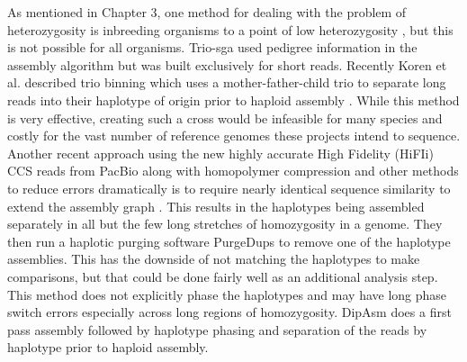 \par{
As mentioned in Chapter 3, one method for dealing with the problem of heterozygosity is inbreeding organisms to a point of low heterozygosity \cite{drosophila}, 
but this is not possible for all organisms. Trio-sga used pedigree information in the assembly algorithm \cite{trio-sga} 
but was built exclusively for short reads. Recently Koren et al. described trio binning which uses a mother-father-child trio to 
separate long reads into their haplotype of origin prior to haploid assembly \cite{triobinning}. 
While this method is very effective, creating such a cross would be infeasible for many species and costly for the vast number of reference genomes these projects intend to sequence. 
Another recent approach using the new highly accurate High Fidelity (HiFIi) CCS reads from PacBio along with homopolymer compression and other methods to reduce errors dramatically is to 
require nearly identical sequence similarity to extend the assembly graph \cite{HICANU}. This results in the haplotypes being assembled separately in all but the few long stretches of homozygosity in 
a genome. They then run a haplotic purging software PurgeDups \cite{purgedups} to remove one of the haplotype assemblies. This has the downside of not matching the haplotypes to make comparisons, but that could be done 
fairly well as an additional analysis step. This method does not explicitly phase the haplotypes and may have long phase switch errors especially across long regions of homozygosity. DipAsm does a first pass assembly followed by haplotype phasing and separation of the reads by haplotype prior to haploid assembly\cite{Garg2021}.
} \\

